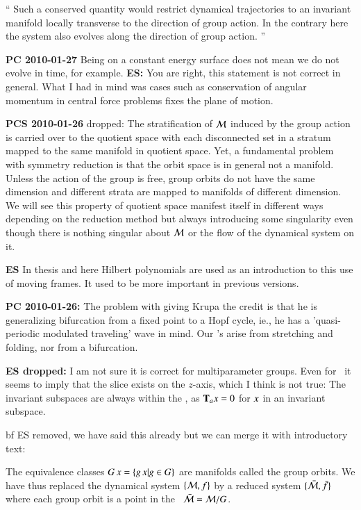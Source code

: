 ``
Such a conserved quantity would restrict dynamical
trajectories to an invariant manifold locally transverse to
the direction of group action. In the contrary here the
system also evolves along the direction of group action.
    ''

{\bf PC 2010-01-27}
Being on a constant energy surface does not mean we do
not evolve in time, for example.
{\bf ES:} You are right, this statement is not correct in
general. What I had in mind was cases such as
conservation of angular momentum in central force 		
problems fixes the plane of motion.

{\bf PCS 2010-01-26} dropped:
The stratification
of ${\cal M}$ induced by the group action is carried over to
the quotient space with each disconnected set in a stratum
mapped to the same manifold in quotient space. Yet, a
fundamental problem with symmetry reduction is that the orbit
space is in general not a manifold. Unless the action of the
group is free, group orbits do not have the same dimension
and different strata are mapped to manifolds of different
dimension. We will see this property of quotient space
manifest itself in different ways depending on the reduction
method but always introducing some singularity even though
there is nothing singular about ${\cal M}$ or the flow of the
dynamical system on it.



{\bf ES} In thesis and here Hilbert
polynomials are used as an introduction to this use of moving
frames. It used to be more important in previous versions.

{\bf PC 2010-01-26:}
   The problem with giving Krupa the credit is that he is
   generalizing bifurcation from a fixed point to a Hopf
   cycle, ie., he has a 'quasi-periodic modulated traveling' wave in mind.
   Our \rpo's arise from stretching and folding, nor from a
   bifurcation.

{\bf ES dropped: }
I am not sure it is correct for multiparameter groups. Even
for \cLe\ it seems to imply that the slice exists on the $z$-axis,
which I think is not true: The
invariant subspaces are always within the \slice, as $\mathbf{T}_a
 x =0$ for $x$ in an invariant subspace.

{bf ES removed, we have said this already but we can merge it
with introductory text:}

The equivalence classes $G \, x = \{  g \, x
| g \in G \}$ are manifolds called the group
orbits. We have thus replaced the dynamical system
$\{{\cal M},f\}$ by a reduced system $\{\bar{{\cal M}},\bar{f}\}$ where
each  group orbit is a point in the \reducedsp\
$\bar{{\cal M}}={\cal M}/G$.

